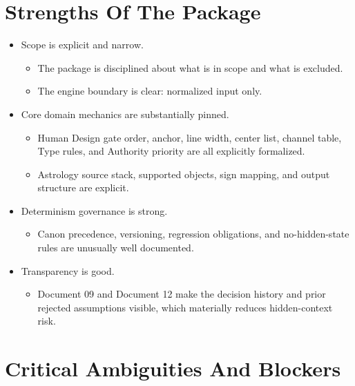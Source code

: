 \documentclass[11pt]{article}
\begin{document}
\section{Strengths Of The Package}
\label{sec:org9f2447f}
\begin{itemize}
\item Scope is explicit and narrow.
\begin{itemize}
\item The package is disciplined about what is in scope and what is excluded.
\item The engine boundary is clear: normalized input only.
\end{itemize}
\item Core domain mechanics are substantially pinned.
\begin{itemize}
\item Human Design gate order, anchor, line width, center list, channel table, Type rules, and Authority priority are all explicitly formalized.
\item Astrology source stack, supported objects, sign mapping, and output structure are explicit.
\end{itemize}
\item Determinism governance is strong.
\begin{itemize}
\item Canon precedence, versioning, regression obligations, and no-hidden-state rules are unusually well documented.
\end{itemize}
\item Transparency is good.
\begin{itemize}
\item Document 09 and Document 12 make the decision history and prior rejected assumptions visible, which materially reduces hidden-context risk.
\end{itemize}
\end{itemize}
\section{Critical Ambiguities And Blockers}
\label{sec:org2fd350f}
\end{document}
